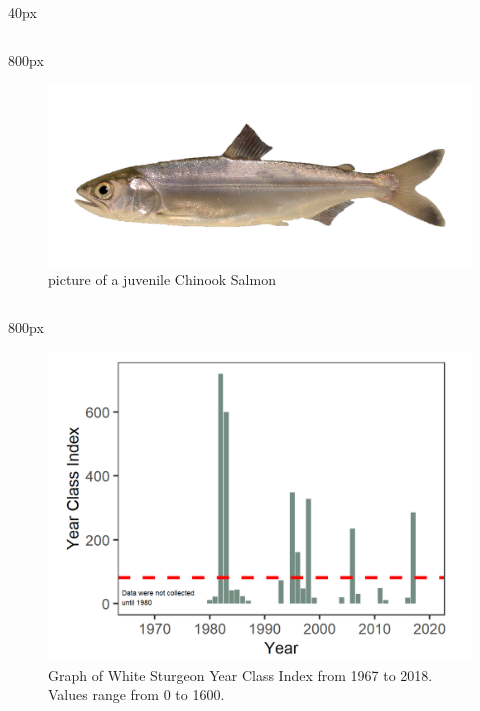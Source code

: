 \documentclass[
]{book}
\begin{document}
\begin{column}{40px\textwidth}
~
\end{column}

\begin{column}{800px\textwidth}
\begin{figure}

{\centering \includegraphics[width=29.17in]{figures/chinook_salmon_smolt} 

}

\caption{picture of a juvenile Chinook Salmon}\label{fig:unnamed-chunk-172}
\end{figure}
\end{column}

\begin{column}{800px\textwidth}
\begin{figure}
\includegraphics[width=15.25in]{figures/whistu_plot_allYears} \caption{Graph of White Sturgeon Year Class Index from 1967 to 2018. Values range from 0 to 1600.}\label{fig:unnamed-chunk-173}
\end{figure}
\end{column}
\end{document}
